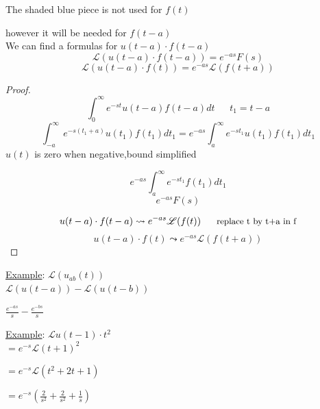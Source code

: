 \documentclass[12pt]{article}
\numberwithin{equation}{subsection}
\newcommand{\lap}{\mathscr{L}}
\newcommand{\indc}{\hspace{1.5cm}}
\newcommand{\indd}{\hspace{2cm}}
\newcommand{\indq}{\hspace{8.5cm}}
\newcommand{\exa}{\noindent \underline{Example}: \hspace{1cm}}
\begin{document}
\indd The shaded blue piece is not used for $f(t)$

\indd however it will be needed for $f(t-a)$\\

We can find a formulas for $u(t-a)\cdot f(t-a)$
\begin{equation}
\lap(u(t-a)\cdot f(t-a))=e^{-as}F(s)
\end{equation}
\begin{equation}
\lap(u(t-a)\cdot f(t))=e^{-as}\lap(f(t+a))
\end{equation}
 \begin{proof}
 \begin{equation}
 \int_0^\infty e^{-st}u(t-a)f(t-a) dt\ \ \ \ \ \ \ t_1=t-a
 \end{equation}
 \begin{equation}
 \int_{-a}^\infty e^{-s(t_1+a)}u(t_1)f(t_1) dt_1 = e^{-as} \int_a^\infty e^{-st_1}u(t_1)f(t_1) dt_1
 \end{equation}
 \indq $u(t)$ is zero when negative,bound simplified
 
 \begin{equation}
 e^{-as} \int_a^\infty e^{-st_1}f(t_1) dt_1
 \end{equation}
 \begin{equation}
 e^{-as}F(s)
 \end{equation}
 
 \begin{equation}
 u(t-a)\cdot f(t-a) \leadsto e^{-as}\lap(f(t))\ \ \ \ \begin{small}\textrm{ replace t by t+a in f}
 \end{small}
 \end{equation}
 \begin{equation}
 u(t-a)\cdot f(t) \leadsto e^{-as}\lap(f(t+a))
 \end{equation}
 \end{proof}
 
 \exa $\lap (u_{ab}(t))$\\
 
 \indd $\lap(u(t-a))-\lap(u(t-b))$
 
  \indc $\displaystyle \frac{e^{-as}}{s}-\frac{e^{-bs}}{s}$

 \newpage
 
 \exa $\lap u(t-1) \cdot t^2$\\
 
 \indd $=e^{-s}\lap (t+1)^2$
 
 \indd $=e^{-s}\lap (t^2+2t+1)$

 \indd $=e^{-s} (\frac{2}{s^2}+\frac{2}{s^2}+\frac{1}{s})$\\
\end{document}

